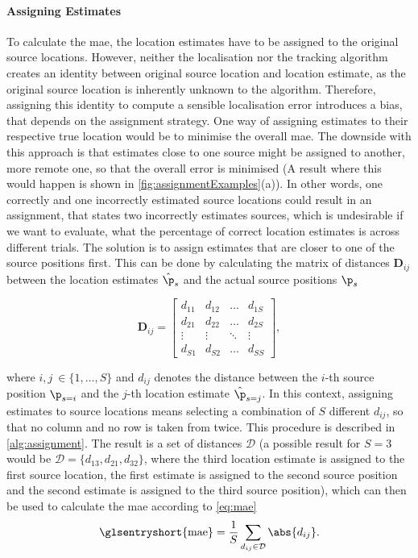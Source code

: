 \paragraph{Assigning Estimates} To calculate the \gls{mae}, the location estimates have to be assigned to the original source locations. However, neither the localisation nor the tracking algorithm creates an identity between original source location and location estimate, as the original source location is inherently unknown to the algorithm. Therefore, assigning this identity to compute a sensible localisation error introduces a bias, that depends on the assignment strategy. One way of assigning estimates to their respective true location would be to minimise the overall \gls{mae}. The downside with this approach is that estimates close to one source might be assigned to another, more remote one, so that the overall error is minimised (A result where this would happen is shown in \autoref{fig:assignmentExamples}(a)). In other words, one correctly and one incorrectly estimated source locations could result in an assignment, that states two incorrectly estimates sources, which is undesirable if we want to evaluate, what the percentage of correct location estimates is across different trials. The solution is to assign estimates that are closer to one of the source positions first. This can be done by calculating the matrix of distances $\bm{D}_{ij}$ between the location estimates $\hat\p_s$ and the actual source positions $\p_s$

\begin{equation}
	\bm{D}_{ij}=
	\begin{bmatrix}
		d_{11} & d_{12} & \dots  & d_{1S} \\
		d_{21} & d_{22} & \dots  & d_{2S}        \\
		\vdots   & \vdots   & \ddots & \vdots   \\
		d_{S1} & d_{S2}        & \dots  & d_{SS}
	\end{bmatrix},
\end{equation}

where $i,j\ \in \{1,\dots,S\}$ and $d_{ij}$ denotes the distance between the $i$-th source position $\p_{s=i}$ and the $j$-th location estimate $\hat\p_{s=j}$. In this context, assigning estimates to source locations means selecting a combination of $S$ different $d_{ij}$, so that no column and no row is taken from twice. This procedure is described in \autoref{alg:assignment}. The result is a set of distances $\mathcal{D}$ (a possible result for $S=3$ would be $\mathcal{D}=\{d_{13}, d_{21}, d_{32}\}$, where the third location estimate is assigned to the first source location, the first estimate is assigned to the second source position and the second estimate is assigned to the third source position), which can then be used to calculate the \gls{mae} according to \eqref{eq:mae}
\begin{equation}
    \text{\glsentryshort{mae}}=\frac{1}{S}\sum_{d_{ij}\in\mathcal{D}}\abs{d_{ij}}.
    \label{eq:mae}
\end{equation}

